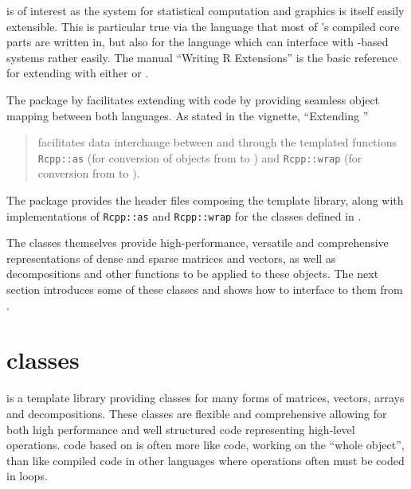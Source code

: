 \documentclass[shortnames,article]{jss}
\begin{document}
 is of interest as the  system for statistical
computation and graphics \citep{R:Main} is itself easily extensible. This is
particular true via the  language that most of 's
compiled core parts are written in, but also for the  language
which can interface with -based systems rather easily. The manual
``Writing R Extensions'' \citep{R:Extensions} is the basic reference for
extending  with either  or .

The  package by \citet{JSS:Rcpp,CRAN:Rcpp} facilitates extending
 with  code by providing seamless object mapping
between both languages.
%
As stated in the  \citep{CRAN:Rcpp} vignette, ``Extending ''
\begin{quote}
   facilitates data interchange between  and
   through the templated functions \texttt{Rcpp::as} (for
  conversion of objects from  to ) and
  \texttt{Rcpp::wrap} (for conversion from  to ).
\end{quote}
The  package provides the header files composing the
  template library, along with implementations of
\texttt{Rcpp::as} and \texttt{Rcpp::wrap} for the 
classes defined in .

The  classes themselves provide high-performance,
versatile and comprehensive representations of dense and sparse
matrices and vectors, as well as decompositions and other functions
to be applied to these objects.  The next section introduces some
of these classes and shows how to interface to them from .

\section[Eigen classes]{ classes}
\label{sec:eclasses}

 is a  template library providing classes for
many forms of matrices, vectors, arrays and decompositions.  These
classes are flexible and comprehensive allowing for both high
performance and well structured code representing high-level
operations.  code based on  is often more like
 code, working on the ``whole object'', than like compiled
code in other languages where operations often must be coded in loops.
\end{document}
